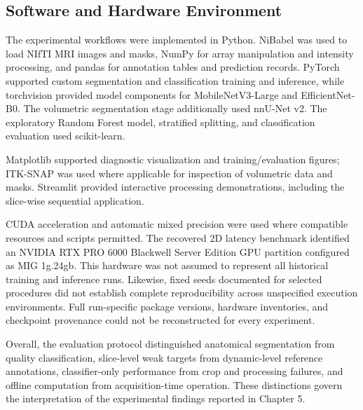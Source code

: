 \subsection{Software and Hardware Environment}
\label{subsec:software-hardware-environment}

The experimental workflows were implemented in Python. NiBabel was used to load NIfTI MRI images and masks, NumPy for array manipulation and intensity processing, and pandas for annotation tables and prediction records. PyTorch supported custom segmentation and classification training and inference, while torchvision provided model components for MobileNetV3-Large and EfficientNet-B0. The volumetric segmentation stage additionally used nnU-Net v2. The exploratory Random Forest model, stratified splitting, and classification evaluation used scikit-learn.

Matplotlib supported diagnostic visualization and training/evaluation figures; ITK-SNAP was used where applicable for inspection of volumetric data and masks. Streamlit provided interactive processing demonstrations, including the slice-wise sequential application.

CUDA acceleration and automatic mixed precision were used where compatible resources and scripts permitted. The recovered 2D latency benchmark identified an NVIDIA RTX PRO 6000 Blackwell Server Edition GPU partition configured as MIG 1g.24gb. This hardware was not assumed to represent all historical training and inference runs. Likewise, fixed seeds documented for selected procedures did not establish complete reproducibility across unspecified execution environments. Full run-specific package versions, hardware inventories, and checkpoint provenance could not be reconstructed for every experiment.

Overall, the evaluation protocol distinguished anatomical segmentation from quality classification, slice-level weak targets from dynamic-level reference annotations, classifier-only performance from crop and processing failures, and offline computation from acquisition-time operation. These distinctions govern the interpretation of the experimental findings reported in Chapter 5.

